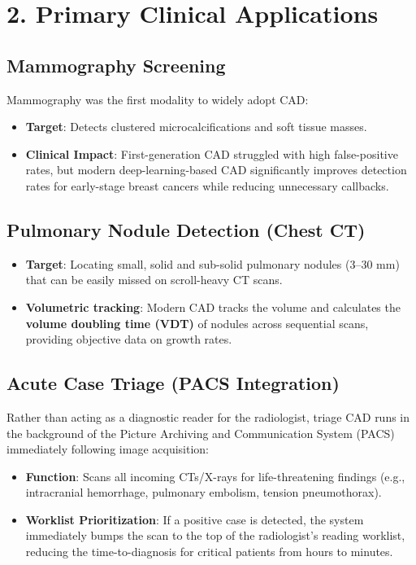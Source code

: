 \section*{2. Primary Clinical Applications}

\subsection*{Mammography Screening}
Mammography was the first modality to widely adopt CAD:
\begin{itemize}
    \item \textbf{Target}: Detects clustered microcalcifications and soft tissue masses.
    \item \textbf{Clinical Impact}: First-generation CAD struggled with high false-positive rates, but modern deep-learning-based CAD significantly improves detection rates for early-stage breast cancers while reducing unnecessary callbacks.
\end{itemize}

\subsection*{Pulmonary Nodule Detection (Chest CT)}
\begin{itemize}
    \item \textbf{Target}: Locating small, solid and sub-solid pulmonary nodules ($3$--$30$ mm) that can be easily missed on scroll-heavy CT scans.
    \item \textbf{Volumetric tracking}: Modern CAD tracks the volume and calculates the \textbf{volume doubling time (VDT)} of nodules across sequential scans, providing objective data on growth rates.
\end{itemize}

\subsection*{Acute Case Triage (PACS Integration)}
Rather than acting as a diagnostic reader for the radiologist, triage CAD runs in the background of the Picture Archiving and Communication System (PACS) immediately following image acquisition:
\begin{itemize}
    \item \textbf{Function}: Scans all incoming CTs/X-rays for life-threatening findings (e.g., intracranial hemorrhage, pulmonary embolism, tension pneumothorax).
    \item \textbf{Worklist Prioritization}: If a positive case is detected, the system immediately bumps the scan to the top of the radiologist's reading worklist, reducing the time-to-diagnosis for critical patients from hours to minutes.
\end{itemize}


